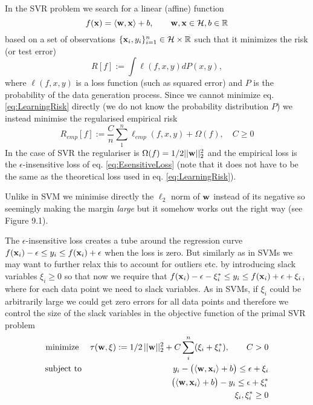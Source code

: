 In the SVR problem we search for a linear (affine) function 
\begin{equation}\label{eq:RegFunction}
 f(\mathbf{x}) = \langle \mathbf{w},\mathbf{x} \rangle + b, \qquad \mathbf{w},\mathbf{x} \in \mathcal{H}, b \in \mathbb{R}
\end{equation}
based on a set of observations $\{\mathbf{x}_i,y_i\}_{i=1}^n \in \mathcal{H} \times \mathbb{R}$
such that it minimizes the risk (or test error)
\begin{equation}\label{eq:LearningRisk}
 R[f] := \int \ell(f,x,y) dP(x,y),
\end{equation}
where $\ell(f,x,y)$ is a loss function (such as squared error) and $P$ is the probability of the data generation process.
Since we cannot minimize eq. \eqref{eq:LearningRisk} directly (we do not know the probability distribution $P$) we instead minimise the regularised empirical risk
\begin{equation}\label{eq:EmpiricalRisk}
 R_{emp}[f] := \frac{C}{n} \sum_1^n \ell_{emp}(f,x,y)+ \Omega(f), \quad C \geq 0
\end{equation}
In the case of SVR the regulariser is $\Omega(f) = 1/2 ||\mathbf{w}||_2^2$ and the empirical loss is the $\epsilon$-insensitive loss of eq. \eqref{eq:EsensitiveLoss} (note that it does not have to be the same as the theoretical loss used in eq. \eqref{eq:LearningRisk}).

Unlike in SVM we minimise directly the $\ell_2$ norm of $\mathbf{w}$ instead of its negative so seemingly making the margin \emph{large} but it somehow works out the right way (see \cite{Scholkopf2002} Figure 9.1).

The $\epsilon$-insensitive loss creates a tube around the regression curve $f(\mathbf{x}_i) - \epsilon \leq y_i \leq f(\mathbf{x}_i) + \epsilon$ when the loss is zero. But similarly as in SVMs we may want to further relax this to account for outliers etc. by introducing slack variables $\xi_i \geq 0$ so that now we require that $f(\mathbf{x}_i) - \epsilon - \xi^*_i \leq y_i \leq f(\mathbf{x}_i) + \epsilon + \xi_i$, where for each data point we need to slack variables. As in SVMs, if $\xi_i$ could be arbitrarily large we could get zero errors for all data points and therefore we control the size of the slack variables in the objective function of the primal SVR problem
\begin{eqnarray}\label{eq:SVRPrimal}\index{SVR primal problem}
  \text{minimize }  & & \tau(\vc{w},\vc{\xi}):= 1/2 \, ||\vc{w}||_2^2 + C \sum_i^n (\xi_i + \xi^*_i), \qquad C>0 \nonumber \\
  \text{subject to} & & 
  y_i - \big( \langle \vc{w},\vc{x}_i \rangle + b \big) \leq \epsilon + \xi_i \nonumber \\
& & \big( \langle \vc{w},\vc{x}_i \rangle + b \big) - y_i \leq \epsilon + \xi^*_i \nonumber \\ 
& & \xi_i, \xi^*_i \geq 0
\end{eqnarray}

